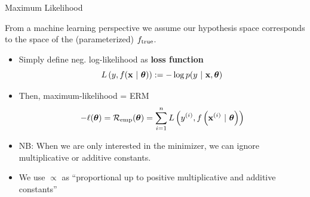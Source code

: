 \documentclass[11pt,compress,t,notes=noshow, xcolor=table]{beamer}
\begin{document}
\begin{vbframe}{Maximum Likelihood}
\framebreak 

From a machine learning perspective we assume our hypothesis space corresponds to the space of the (parameterized) $f_{\text{true}}$. 

\begin{itemize}
\item Simply define neg. log-likelihood as \textbf{loss function} 
$$ L\left(y, f(\mathbf{x} ~|~ \bm{\theta})\right) := - \log p(y ~|~\mathbf{x}, \bm{\theta}) $$
\item Then, maximum-likelihood 
 = ERM
$$- \ell(\bm{\theta}) = \mathcal{R}_{\text{emp}}(\bm{\theta}) = \sum\limits_{i=1}^n L\left(y^{(i)}, f\left(\mathbf{x}^{(i)} ~|~ \bm{\theta}\right)\right)$$

\item NB: When we are only interested in the minimizer, we can ignore multiplicative or additive constants.
\item We use $\propto$ as \enquote{proportional up to positive multiplicative and additive constants}

\end{itemize}

\end{vbframe}
\end{document}
